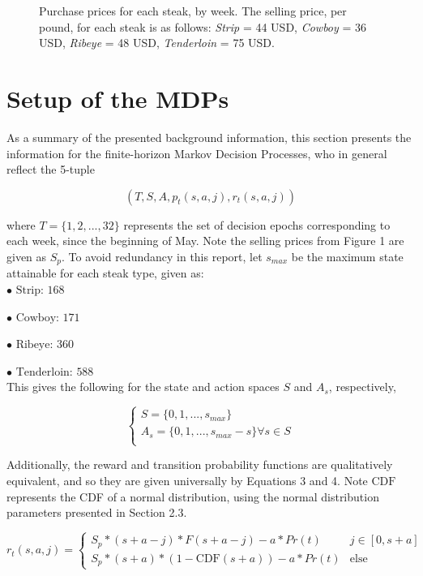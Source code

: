 \documentclass[12pt,a4paper]{article}
\begin{document}
\begin{figure}[H]
\caption{Purchase prices for each steak, by week. The selling price, per pound, for each steak is as follows: \textit{Strip} = 44 USD, \textit{Cowboy} = 36 USD, \textit{Ribeye} = 48 USD, \textit{Tenderloin} = 75 USD.}
\end{figure}

\section{Setup of the MDPs}

As a summary of the presented background information, this section presents the information for the finite-horizon Markov Decision Processes, who in general reflect the 5-tuple

$$(T, S, A, p_{t}(s,a,j), r_{t}(s,a,j)) $$

where $T = \{1,2,...,32\}$ represents the set of decision epochs corresponding to each week, since the beginning of May. Note the selling prices from Figure 1 are given as $S_{p}$. To avoid redundancy in this report, let $s_{max}$ be the maximum state attainable for each steak type, given as:
\\

$ \bullet \text{ Strip: } 168  $

$ \bullet \text{ Cowboy: } 171  $

$ \bullet \text{ Ribeye: } 360  $

$ \bullet \text{ Tenderloin: } 588  $
\\

This gives the following for the state and action spaces $S$ and $A_s$, respectively,

$$\begin{cases}
S = \{0, 1, ..., s_{max} \} \\
A_{s} = \{0, 1, ..., s_{max} - s \} \forall s \in S \\
\end{cases}$$

Additionally, the reward and transition probability functions are qualitatively equivalent, and so they are given universally by Equations 3 and 4. Note $\text{CDF}$ represents the CDF of a normal distribution, using the normal distribution parameters presented in Section 2.3.

\small
\begin{equation} \label{3}
r_{t}(s,a,j) = \begin{cases} S_{p} *(s + a - j) * F(s + a - j) - a*Pr(t) & j \in [0,s+a] \\ S_{p} *(s + a) * (1 -  \text{CDF}(s + a)) - a*Pr(t) & \text{else} \end{cases} 
\end{equation}
\end{document}
